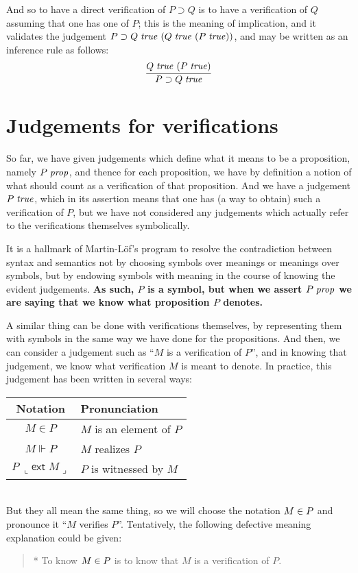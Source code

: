 \documentclass[main.tex]{subfiles}
\begin{document}
And so to have a direct verification of $P\supset Q$ is to have a
verification of $Q$ assuming that one has one of $P$; this is the
meaning of implication, and it validates the judgement
$P\supset Q\;\mathit{true}\ (Q\;\mathit{true}\ (P\;\mathit{true}))$, and may be
written as an inference rule as follows:
\[
  \infer{
    \istrue{P\supset Q}
  }{
    \hyp{\istrue{Q}}{\istrue{P}}
  }
\]

\section{Judgements for verifications}

So far, we have given judgements which define what it means to be a
proposition, namely $P\;\mathit{prop}$, and thence for each proposition, we
have by definition a notion of what should count as a verification of
that proposition. And we have a judgement $P\;\mathit{true}$, which in its
assertion means that one has (a way to obtain) such a verification of
$P$, but we have not considered any judgements which actually refer to
the verifications themselves symbolically.

It is a hallmark of Martin-L\"of's program to resolve the
contradiction between syntax and semantics not by choosing symbols
over meanings or meanings over symbols, but by endowing symbols with
meaning in the course of knowing the evident judgements. \textbf{As
such, $P$ is a symbol, but when we assert $P\;\mathit{prop}$ we are saying
that we know what proposition $P$ denotes.}

A similar thing can be done with verifications themselves, by
representing them with symbols in the same way we have done for the
propositions. And then, we can consider a judgement such as ``$M$ is a
verification of $P$'', and in knowing that judgement, we know what
verification $M$ is meant to denote. In practice, this judgement has
been written in several ways:\\[10pt]
\begin{tabular}{c|l}
  Notation & Pronunciation \\ \hline
  $M\in P$ & $M$ is an element of $P$\\
  $M\Vdash P$ & $M$ realizes $P$\\
  $P\ \llcorner\mathsf{ext}\; M\lrcorner$ & $P$ is witnessed by $M$
\end{tabular}\\

But they all mean the same thing, so we will choose the notation
$M\in P$ and pronounce it ``$M$ verifies $P$''. Tentatively, the
following defective meaning explanation could be given:
\begin{quote}
  * To know $M\in P$ is to know that $M$ is a verification of $P$.
\end{quote}
\end{document}
